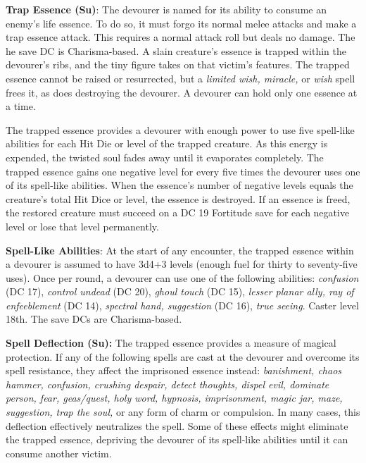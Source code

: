 \documentclass{article}
\begin{document}
\textbf{Trap Essence (Su)}: The devourer is named for its ability to consume an 
enemy's life essence. To do so, it must forgo its normal melee attacks and make 
a trap essence attack. This requires a normal attack roll but deals no damage. 
The he save DC is Charisma-based. A slain creature's essence is trapped within 
the devourer's ribs, and the tiny figure takes on that victim's features. The trapped 
essence cannot be raised or resurrected, but a \textit{limited wish, miracle, }or 
\textit{wish }spell frees it, as does destroying the devourer. A devourer can hold 
only one essence at a time.

The trapped essence provides a devourer with enough power to use five spell-like 
abilities for each Hit Die or level of the trapped creature. As this energy is 
expended, the twisted soul fades away until it evaporates completely. The trapped 
essence gains one negative level for every five times the devourer uses one of 
its spell-like abilities. When the essence's number of negative levels equals the 
creature's total Hit Dice or level, the essence is destroyed. If an essence is 
freed, the restored creature must succeed on a DC 19 Fortitude save for each negative 
level or lose that level permanently.

\textbf{Spell-Like Abilities}: At the start of any encounter, the trapped essence 
within a devourer is assumed to have 3d4+3 levels (enough fuel for thirty to seventy-five 
uses). Once per round, a devourer can use one of the following abilities: \textit{confusion 
}(DC 17), \textit{control undead }(DC 20), \textit{ghoul touch }(DC 15), \textit{lesser 
planar ally, ray of enfeeblement }(DC 14), \textit{spectral hand, suggestion }(DC 
16), \textit{true seeing}. Caster level 18th. The save DCs are Charisma-based.

\textbf{Spell Deflection (Su):} The trapped essence provides a measure of magical 
protection. If any of the following spells are cast at the devourer and overcome 
its spell resistance, they affect the imprisoned essence instead: \textit{banishment, 
chaos hammer, confusion, crushing despair, detect thoughts, dispel evil, dominate 
person, fear, geas/quest, holy word, hypnosis, imprisonment, magic jar, maze, suggestion, 
trap the soul, }or any form of charm or compulsion. In many cases, this deflection 
effectively neutralizes the spell. Some of these effects might eliminate the trapped 
essence, depriving the devourer of its spell-like abilities until it can consume 
another victim. 

\newpage
\end{document}
